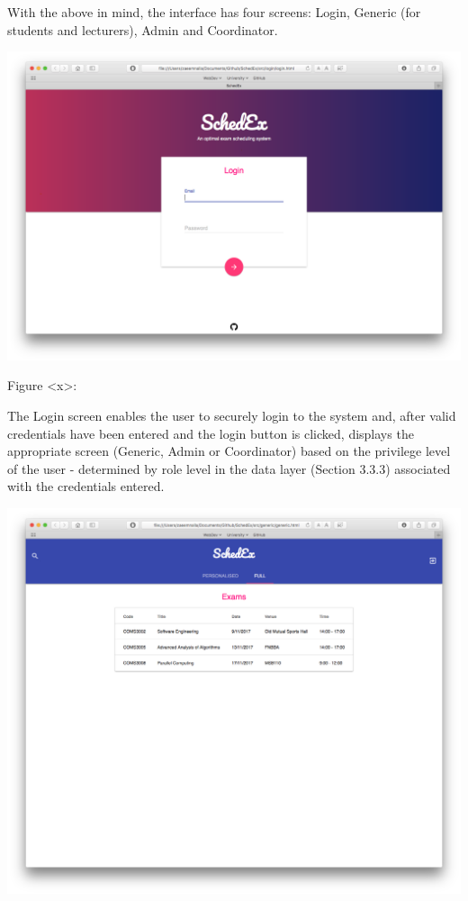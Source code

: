 \documentclass{article}
\begin{document}
With the above in mind, the interface has four screens: Login, Generic (for students and lecturers), Admin and Coordinator.

\centerline{\includegraphics[scale=0.4]{login}} 

Figure <x>: 

The Login screen enables the user to securely login to the system and, after valid credentials have been entered and the login button is clicked,  displays the appropriate screen (Generic, Admin or Coordinator) based on the privilege level of the user - determined by role level in the data layer (Section 3.3.3) associated with the credentials entered.   

\centerline{\includegraphics[scale=0.4]{generic_full}}
\end{document}
